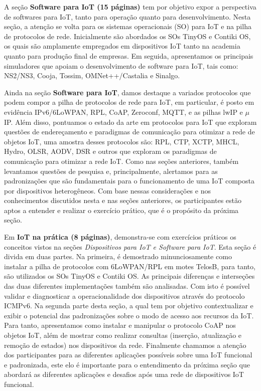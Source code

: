\documentclass{SBCbookchapter}
\begin{document}
A seção \textbf{Software para IoT (15 páginas)} tem por 
objetivo expor a perspectiva de softwares para IoT, tanto para operação quanto 
para desenvolvimento. Nesta seção, a atenção se volta para os sistemas 
operacionais (SO) para IoT e na pilha de protocolos de rede. Inicialmente são 
abordados os SOs TinyOS e Contiki OS, os quais são amplamente empregados em 
dispositivos IoT tanto na academia quanto para produção final de empresas. Em 
seguida, apresentamos os principais simuladores que apoiam o desenvolvimento de 
software para IoT, tais como: NS2/NS3, Cooja, Tossim, OMNet++/Castalia e 
Sinalgo. 

Ainda na seção \textbf{Software para IoT}, damos destaque a variados protocolos 
que podem compor a pilha de protocolos de rede para IoT, em particular, é posto 
em evidência IPv6/6LoWPAN, RPL, CoAP, Zeroconf, MQTT, e as pilhas lwIP e 
$\mu$IP. Além disso, pontuamos o estado da arte em protocolos para IoT que 
exploram questões de endereçamento e paradigmas de comunicação para otimizar a 
rede de objetos IoT, uma amostra desses protocolos são: RPL, CTP, XCTP, MHCL, 
Hydro, OLSR, AODV, DSR e outros que exploram os paradigmas de comunicação para 
otimizar a rede IoT. Como nas seções anteriores, também levantamos questões de 
pesquisa e, principalmente, alertamos para as padronizações que são fundamentais 
para o funcionamento de uma IoT composta por dispositivos heterogêneos. Com base 
nessas considerações e nos conhecimentos discutidos nesta e nas seções 
anteriores, os participantes estão aptos a entender e realizar o exercício 
prático, que é o propósito da próxima seção.

Em \textbf{IoT na prática (8 páginas)}, demonstra-se com
exercícios práticos os conceitos vistos na seções \textit{Dispositivos para IoT 
e Software para IoT}. Esta seção é divida em duas partes. Na primeira, é 
demostrado minunciosamente como instalar a pilha de protocolos com 6LoWPAN/RPL 
em motes TelosB, para tanto, são utilizados os SOs TinyOS e Contiki OS. As 
principais diferenças e interseções das duas diferentes implementações também 
são analisadas. Com isto é possível validar e diagnosticar a operacionalidade 
dos dispositivos através do protocolo ICMPv6. Na segunda parte desta seção, a 
qual tem por objetivo contextualizar e exibir o potencial das padronizações 
sobre o modo de acesso aos recursos da IoT. Para tanto, apresentamos como 
instalar e manipular o protocolo CoAP nos objetos IoT, além de mostrar como 
realizar consultas (inserção, atualização e remoção de estados) nos dispositivos 
da rede. Finalmente chamamos a atenção dos participantes para as diferentes 
aplicações possíveis sobre uma IoT funcional e padronizada, este elo é 
importante para o entendimento da próxima seção que abordará as diferentes 
aplicações e desafios após uma rede de dispositivos IoT funcional.
\end{document}
